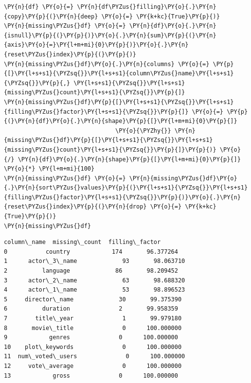     \begin{tcolorbox}[breakable, size=fbox, boxrule=1pt, pad at break*=1mm,colback=cellbackground, colframe=cellborder]
\begin{Verbatim}[commandchars=\\\{\}]
\PY{n}{df} \PY{o}{=} \PY{n}{df\PYZus{}filling}\PY{o}{.}\PY{n}{copy}\PY{p}{(}\PY{n}{deep} \PY{o}{=} \PY{k+kc}{True}\PY{p}{)}
\PY{n}{missing\PYZus{}df} \PY{o}{=} \PY{n}{df}\PY{o}{.}\PY{n}{isnull}\PY{p}{(}\PY{p}{)}\PY{o}{.}\PY{n}{sum}\PY{p}{(}\PY{n}{axis}\PY{o}{=}\PY{l+m+mi}{0}\PY{p}{)}\PY{o}{.}\PY{n}{reset\PYZus{}index}\PY{p}{(}\PY{p}{)}
\PY{n}{missing\PYZus{}df}\PY{o}{.}\PY{n}{columns} \PY{o}{=} \PY{p}{[}\PY{l+s+s1}{\PYZsq{}}\PY{l+s+s1}{column\PYZus{}name}\PY{l+s+s1}{\PYZsq{}}\PY{p}{,} \PY{l+s+s1}{\PYZsq{}}\PY{l+s+s1}{missing\PYZus{}count}\PY{l+s+s1}{\PYZsq{}}\PY{p}{]}
\PY{n}{missing\PYZus{}df}\PY{p}{[}\PY{l+s+s1}{\PYZsq{}}\PY{l+s+s1}{filling\PYZus{}factor}\PY{l+s+s1}{\PYZsq{}}\PY{p}{]} \PY{o}{=} \PY{p}{(}\PY{n}{df}\PY{o}{.}\PY{n}{shape}\PY{p}{[}\PY{l+m+mi}{0}\PY{p}{]} 
                                \PY{o}{\PYZhy{}} \PY{n}{missing\PYZus{}df}\PY{p}{[}\PY{l+s+s1}{\PYZsq{}}\PY{l+s+s1}{missing\PYZus{}count}\PY{l+s+s1}{\PYZsq{}}\PY{p}{]}\PY{p}{)} \PY{o}{/} \PY{n}{df}\PY{o}{.}\PY{n}{shape}\PY{p}{[}\PY{l+m+mi}{0}\PY{p}{]} \PY{o}{*} \PY{l+m+mi}{100}
\PY{n}{missing\PYZus{}df} \PY{o}{=} \PY{n}{missing\PYZus{}df}\PY{o}{.}\PY{n}{sort\PYZus{}values}\PY{p}{(}\PY{l+s+s1}{\PYZsq{}}\PY{l+s+s1}{filling\PYZus{}factor}\PY{l+s+s1}{\PYZsq{}}\PY{p}{)}\PY{o}{.}\PY{n}{reset\PYZus{}index}\PY{p}{(}\PY{n}{drop} \PY{o}{=} \PY{k+kc}{True}\PY{p}{)}
\PY{n}{missing\PYZus{}df}
\end{Verbatim}
\end{tcolorbox}

            \begin{tcolorbox}[breakable, boxrule=.5pt, size=fbox, pad at break*=1mm, opacityfill=0]
\begin{Verbatim}[commandchars=\\\{\}]
        column\_name  missing\_count  filling\_factor
0           country            174       96.377264
1      actor\_3\_name             93       98.063710
2          language             86       98.209452
3      actor\_2\_name             63       98.688320
4      actor\_1\_name             53       98.896523
5     director\_name             30       99.375390
6          duration              2       99.958359
7        title\_year              1       99.979180
8       movie\_title              0      100.000000
9            genres              0      100.000000
10    plot\_keywords              0      100.000000
11  num\_voted\_users              0      100.000000
12     vote\_average              0      100.000000
13            gross              0      100.000000
\end{Verbatim}
\end{tcolorbox}
        
